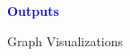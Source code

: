 \documentclass[landscape,paperwidth=70in,paperheight=46in,fontscale=0.225]{baposter} %
\begin{document}
\begin{poster}
{%



%
%
%


\begin{center}
\textcolor{blue}{\large\textbf{Outputs}}
\end{center}


Graph Visualizations

}
\end{poster}
\end{document}
